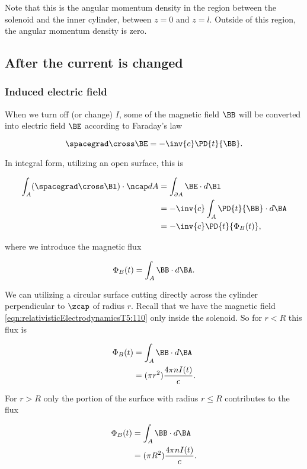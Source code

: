 Note that this is the angular momentum density in the region between the solenoid and the inner cylinder, between $z = 0$ and $z = l$.  Outside of this region, the angular momentum density is zero.

\subsection{After the current is changed}
\subsubsection{Induced electric field}

When we turn off (or change) $I$, some of the magnetic field $\BB$ will be converted into electric field $\BE$ according to Faraday's law

\begin{equation}\label{eqn:relativisticElectrodynamicsT5:290}
\spacegrad \cross \BE = - \inv{c} \PD{t}{\BB}.
\end{equation}

In integral form, utilizing an open surface, this is

\begin{align*}
\int_A (\spacegrad \cross \Bl) \cdot \ncap dA
&=
\int_{\partial A} \BE \cdot d\Bl \\
&= - \inv{c} \int_A \PD{t}{\BB} \cdot d\BA \\
&= - \inv{c} \PD{t}{\Phi_B(t)},
\end{align*}

where we introduce the magnetic flux

\begin{equation}\label{eqn:relativisticElectrodynamicsT5:291}
\Phi_B(t) = \int_A \BB \cdot d\BA.
\end{equation}

We can utilizing a circular surface cutting directly across the cylinder perpendicular to $\zcap$ of radius $r$.  Recall that we have the magnetic field \ref{eqn:relativisticElectrodynamicsT5:110} only inside the solenoid.  So for $r < R$ this flux is

\begin{align*}
\Phi_B(t)
&= \int_A \BB \cdot d\BA \\
&= (\pi r^2) \frac{4 \pi n I(t)}{c}.
\end{align*}

For $r > R$ only the portion of the surface with radius $r \le R$ contributes to the flux

\begin{align*}
\Phi_B(t)
&= \int_A \BB \cdot d\BA \\
&= (\pi R^2) \frac{4 \pi n I(t)}{c}.
\end{align*}

